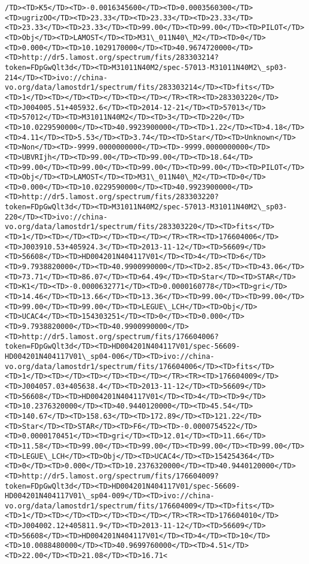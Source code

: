 \documentclass[11pt]{article}
\begin{document}
\begin{Verbatim}[commandchars=\\\{\}]
/TD><TD>K5</TD><TD>-0.0016345600</TD><TD>0.0003560300</TD><TD>ugrizOO</TD><TD>23.33</TD><TD>23.33</TD><TD>23.33</TD><TD>23.33</TD><TD>23.33</TD><TD>99.00</TD><TD>99.00</TD><TD>PILOT</TD><TD>Obj</TD><TD>LAMOST</TD><TD>M31\_011N40\_M2</TD><TD>0</TD><TD>0.000</TD><TD>10.1029170000</TD><TD>40.9674720000</TD><TD>http://dr5.lamost.org/spectrum/fits/283303214?token=FDpGwQlt3d</TD><TD>M31011N40M2/spec-57013-M31011N40M2\_sp03-214</TD><TD>ivo://china-vo.org/data/lamostdr1/spectrum/fits/283303214</TD><TD>fits</TD><TD>1</TD><TD></TD><TD></TD><TD></TD></TR><TR><TD>283303220</TD><TD>J004005.51+405932.6</TD><TD>2014-12-21</TD><TD>57013</TD><TD>57012</TD><TD>M31011N40M2</TD><TD>3</TD><TD>220</TD><TD>10.0229590000</TD><TD>40.9923900000</TD><TD>1.22</TD><TD>4.18</TD><TD>4.11</TD><TD>5.53</TD><TD>3.74</TD><TD>Star</TD><TD>Unknown</TD><TD>Non</TD><TD>-9999.0000000000</TD><TD>-9999.0000000000</TD><TD>UBVRIjh</TD><TD>99.00</TD><TD>99.00</TD><TD>18.64</TD><TD>99.00</TD><TD>99.00</TD><TD>99.00</TD><TD>99.00</TD><TD>PILOT</TD><TD>Obj</TD><TD>LAMOST</TD><TD>M31\_011N40\_M2</TD><TD>0</TD><TD>0.000</TD><TD>10.0229590000</TD><TD>40.9923900000</TD><TD>http://dr5.lamost.org/spectrum/fits/283303220?token=FDpGwQlt3d</TD><TD>M31011N40M2/spec-57013-M31011N40M2\_sp03-220</TD><TD>ivo://china-vo.org/data/lamostdr1/spectrum/fits/283303220</TD><TD>fits</TD><TD>1</TD><TD></TD><TD></TD><TD></TD></TR><TR><TD>176604006</TD><TD>J003910.53+405924.3</TD><TD>2013-11-12</TD><TD>56609</TD><TD>56608</TD><TD>HD004201N404117V01</TD><TD>4</TD><TD>6</TD><TD>9.7938820000</TD><TD>40.9900990000</TD><TD>2.85</TD><TD>43.06</TD><TD>73.71</TD><TD>86.07</TD><TD>64.49</TD><TD>Star</TD><TD>STAR</TD><TD>K1</TD><TD>-0.0000632771</TD><TD>0.0000160778</TD><TD>gri</TD><TD>14.46</TD><TD>13.66</TD><TD>13.36</TD><TD>99.00</TD><TD>99.00</TD><TD>99.00</TD><TD>99.00</TD><TD>LEGUE\_LCH</TD><TD>Obj</TD><TD>UCAC4</TD><TD>154303251</TD><TD>0</TD><TD>0.000</TD><TD>9.7938820000</TD><TD>40.9900990000</TD><TD>http://dr5.lamost.org/spectrum/fits/176604006?token=FDpGwQlt3d</TD><TD>HD004201N404117V01/spec-56609-HD004201N404117V01\_sp04-006</TD><TD>ivo://china-vo.org/data/lamostdr1/spectrum/fits/176604006</TD><TD>fits</TD><TD>1</TD><TD></TD><TD></TD><TD></TD></TR><TR><TD>176604009</TD><TD>J004057.03+405638.4</TD><TD>2013-11-12</TD><TD>56609</TD><TD>56608</TD><TD>HD004201N404117V01</TD><TD>4</TD><TD>9</TD><TD>10.2376320000</TD><TD>40.9440120000</TD><TD>45.54</TD><TD>140.67</TD><TD>158.63</TD><TD>172.89</TD><TD>121.22</TD><TD>Star</TD><TD>STAR</TD><TD>F6</TD><TD>-0.0000754522</TD><TD>0.0000170451</TD><TD>gri</TD><TD>12.01</TD><TD>11.66</TD><TD>11.58</TD><TD>99.00</TD><TD>99.00</TD><TD>99.00</TD><TD>99.00</TD><TD>LEGUE\_LCH</TD><TD>Obj</TD><TD>UCAC4</TD><TD>154254364</TD><TD>0</TD><TD>0.000</TD><TD>10.2376320000</TD><TD>40.9440120000</TD><TD>http://dr5.lamost.org/spectrum/fits/176604009?token=FDpGwQlt3d</TD><TD>HD004201N404117V01/spec-56609-HD004201N404117V01\_sp04-009</TD><TD>ivo://china-vo.org/data/lamostdr1/spectrum/fits/176604009</TD><TD>fits</TD><TD>1</TD><TD></TD><TD></TD><TD></TD></TR><TR><TD>176604010</TD><TD>J004002.12+405811.9</TD><TD>2013-11-12</TD><TD>56609</TD><TD>56608</TD><TD>HD004201N404117V01</TD><TD>4</TD><TD>10</TD><TD>10.0088480000</TD><TD>40.9699760000</TD><TD>4.51</TD><TD>22.00</TD><TD>21.08</TD><TD>16.71<
\end{Verbatim}
\end{document}
